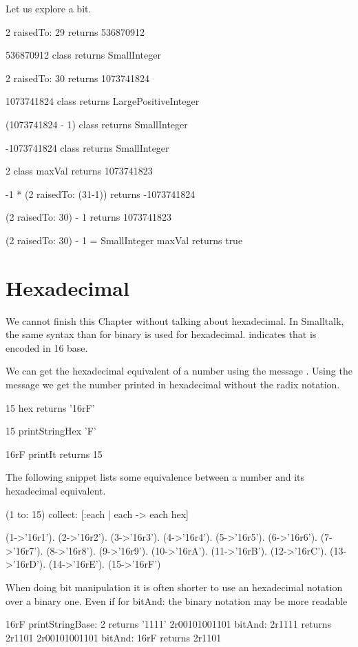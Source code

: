 \documentclass[a4paper,10pt,twoside]{book}
\begin{document}
Let us explore a bit. 

\begin{code}{}
2 raisedTo: 29 
	returns 536870912 

536870912 class
	returns SmallInteger

2 raisedTo: 30 
	returns 1073741824

1073741824 class
	returns LargePositiveInteger
	
(1073741824 - 1) class
	returns SmallInteger

-1073741824 class 
	returns SmallInteger

2 class maxVal 
	returns 1073741823

-1 * (2 raisedTo: (31-1)) 
	returns -1073741824
	
(2 raisedTo: 30) - 1
	returns 1073741823
	
(2 raisedTo: 30) - 1 = SmallInteger maxVal	
	returns true
\end{code}

\section{Hexadecimal}
We cannot finish this Chapter without talking about hexadecimal. In Smalltalk, the same syntax than for binary is used for hexadecimal.  indicates that  is encoded in 16 base. 

We can get the hexadecimal equivalent of a number using the message . 
Using the message  we get the number printed in hexadecimal without the radix notation. 

\begin{code}
15 hex
	returns '16rF'
	
15 printStringHex 'F'

16rF printIt
	returns 15
\end{code}

The following snippet lists some equivalence between a number and its hexadecimal equivalent.
\begin{code}
(1 to: 15) collect: [:each | each -> each hex] 

{(1->'16r1'). (2->'16r2'). (3->'16r3'). (4->'16r4'). (5->'16r5'). (6->'16r6'). (7->'16r7'). (8->'16r8'). (9->'16r9'). (10->'16rA'). (11->'16rB'). (12->'16rC'). (13->'16rD'). (14->'16rE'). (15->'16rF')}
\end{code}

When doing bit manipulation it is often shorter to use an hexadecimal notation over a binary one. Even if for bitAnd: the binary notation may be more readable
\begin{code}{}
16rF printStringBase: 2
	returns '1111'
2r00101001101 bitAnd: 2r1111	
	returns 2r1101
2r00101001101 bitAnd: 16rF
	returns 2r1101
\end{code}
\end{document}

